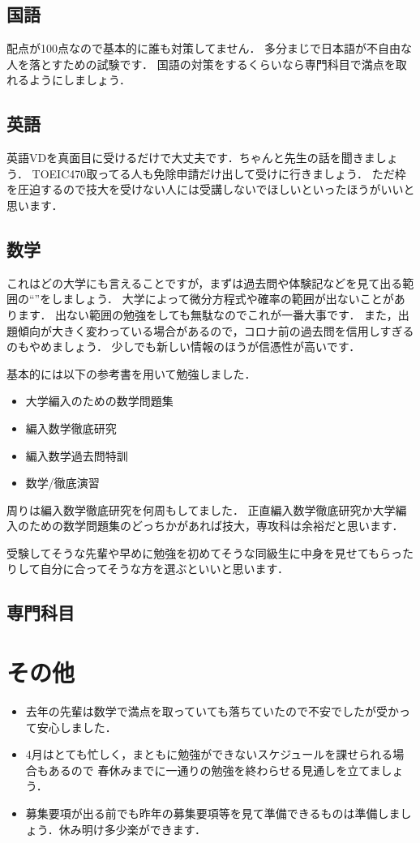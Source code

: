 \documentclass[dvipdfmx]{jsarticle}
\begin{document}
\subsection{国語}
配点が100点なので基本的に誰も対策してません．
多分まじで日本語が不自由な人を落とすための試験です．
国語の対策をするくらいなら専門科目で満点を取れるようにしましょう．

\subsection{英語}
英語VDを真面目に受けるだけで大丈夫です．ちゃんと先生の話を聞きましょう．
TOEIC470取ってる人も免除申請だけ出して受けに行きましょう．
ただ枠を圧迫するので技大を受けない人には受講しないでほしいといったほうがいいと思います．

\subsection{数学}
これはどの大学にも言えることですが，まずは過去問や体験記などを見て出る範囲の``''をしましょう．
大学によって微分方程式や確率の範囲が出ないことがあります．
出ない範囲の勉強をしても無駄なのでこれが一番大事です．
また，出題傾向が大きく変わっている場合があるので，コロナ前の過去問を信用しすぎるのもやめましょう．
少しでも新しい情報のほうが信憑性が高いです．

基本的には以下の参考書を用いて勉強しました．
\begin{itemize}
  \item 大学編入のための数学問題集
  \item 編入数学徹底研究
  \item 編入数学過去問特訓
  \item 数学/徹底演習
\end{itemize}
周りは編入数学徹底研究を何周もしてました．
正直編入数学徹底研究か大学編入のための数学問題集のどっちかがあれば技大，専攻科は余裕だと思います．

受験してそうな先輩や早めに勉強を初めてそうな同級生に中身を見せてもらったりして自分に合ってそうな方を選ぶといいと思います．

\subsection{専門科目}



\section{その他}
\begin{itemize}
  \item 去年の先輩は数学で満点を取っていても落ちていたので不安でしたが受かって安心しました．
  \item 4月はとても忙しく，まともに勉強ができないスケジュールを課せられる場合もあるので
        春休みまでに一通りの勉強を終わらせる見通しを立てましょう．
  \item 募集要項が出る前でも昨年の募集要項等を見て準備できるものは準備しましょう．休み明け多少楽ができます．
\end{itemize}
\end{document}

